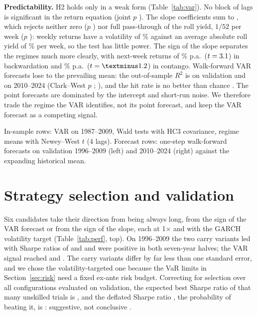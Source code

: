 \documentclass[10pt,a4paper]{article}
\newcommand{\tabnote}[1]{\par\vspace{2pt}\begin{minipage}{\linewidth}\scriptsize\color{muted}#1\end{minipage}}
\begin{document}
\textbf{Predictability.} H2 holds only in a weak form (Table~\ref{tab:var}). No block of lags is significant in the return equation (joint $p$ \NGrangerAllP). The slope coefficients sum to \NPassSum, which rejects neither zero ($p$ \NPassZeroP) nor full pass-through of the roll yield, $1/52$ per week ($p$ \NPassFullP): weekly returns have a volatility of \NWeeklyVolIs\% against an average absolute roll yield of \NCarryWeekIs\% per week, so the test has little power. The sign of the slope separates the regimes much more clearly, with next-week returns of \NBackAnn\% p.a.\ ($t=3.1$) in backwardation and \NContAnn\% p.a.\ ($t=\NContT$) in contango. Walk-forward VAR forecasts lose to the prevailing mean: the out-of-sample $R^2$ \citep{campbell2008} is \NOosRtwoVal{} on validation and \NOosRtwoOos{} on 2010--2024 (Clark--West $p$ \NCwPOos; \citealp{clark2007}), and the hit rate is no better than chance \citep{pesaran1992}. The point forecasts are dominated by the intercept and short-run noise. We therefore trade the regime the VAR identifies, not its point forecast, and keep the VAR forecast as a competing signal.

\begin{table}[t]
\centering\footnotesize
\caption{Return predictability in the weekly VAR(\NVarLags)}\label{tab:var}

\tabnote{In-sample rows: VAR on 1987--2009, Wald tests with HC3 covariance, regime means with Newey--West $t$ (4 lags). Forecast rows: one-step walk-forward forecasts on validation 1996--2009 (left) and 2010--2024 (right) against the expanding historical mean.}
\end{table}

\section{Strategy selection and validation}
Six candidates take their direction from being always long, from the sign of the VAR forecast or from the sign of the slope, each at 1$\times$ and with the GARCH volatility target (Table~\ref{tab:perf}, top). On 1996--2009 the two carry variants led with Sharpe ratios of \NValSharpeCarry{} and \NValSharpeMain{} and were positive in both seven-year halves; the VAR signal reached \NValSharpeVar{} and \NValSharpeVarVol. The carry variants differ by far less than one standard error, and we chose the volatility-targeted one because the VaR limits in Section~\ref{sec:risk} need a fixed ex-ante risk budget. Correcting for selection over all \NNTrials{} configurations evaluated on validation, the expected best Sharpe ratio of that many unskilled trials is \NDsrHurdle, and the deflated Sharpe ratio \citep{bailey2014}, the probability of beating it, is \NDsr: suggestive, not conclusive \citep{harvey2016}.
\end{document}
